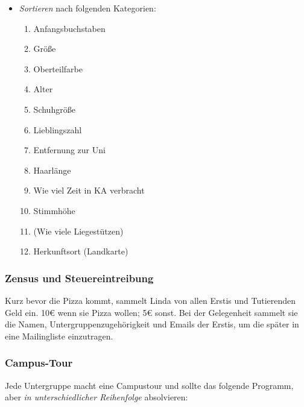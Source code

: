 \documentclass[10pt,ngerman]{scrartcl}
\begin{document}
\begin{multicols}{2}
\begin{itemize}
    \item \emph{Sortieren} nach folgenden Kategorien:
        \begin{enumerate}
            \item Anfangsbuchstaben
            \item Größe
            \item Oberteilfarbe
            \item Alter
            \item Schuhgröße
            \item Lieblingszahl
            \item Entfernung zur Uni
            \item Haarlänge
            \item Wie viel Zeit in KA verbracht
            \item Stimmhöhe
            \item (Wie viele Liegestützen)
            \item Herkunftsort (Landkarte)
        \end{enumerate}
\end{itemize}

\subsubsection{Zensus und Steuereintreibung}

Kurz bevor die Pizza kommt, sammelt Linda von allen Erstis und Tutierenden Geld
ein. 10€ wenn sie Pizza wollen; 5€ sonst. Bei der Gelegenheit sammelt sie die
Namen, Untergruppenzugehörigkeit und Emails der Erstis, um die später in eine
Mailingliste einzutragen.

\subsubsection{Campus-Tour}

Jede Untergruppe macht eine Campustour und sollte das folgende Programm, aber
\emph{in unterschiedlicher Reihenfolge} absolvieren:


\end{multicols}
\end{document}
